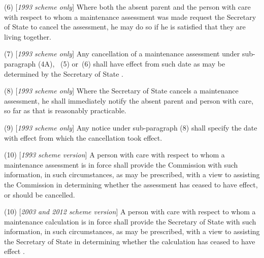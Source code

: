 \documentclass[12pt,a4paper]{article}
\begin{document}
(6) [\emph{1993 scheme only}] Where both the absent parent and the person with care with respect to whom a maintenance assessment was made request 
the Secretary of State  %
to cancel the assessment, he may do so if he is satisfied that they are living together.

(7) [\emph{1993 scheme only}] Any cancellation of a maintenance assessment under sub-paragraph 
(4A),~%
(5)  or~(6)  shall have effect from such date as may be determined by 
the Secretary of State%
.

(8) [\emph{1993 scheme only}] Where 
the Secretary of State  %
cancels a maintenance assessment, he shall immediately notify the absent parent and person with care, so far as that is reasonably practicable.

(9) [\emph{1993 scheme only}] Any notice under sub-paragraph (8)  shall specify the date with effect from which the cancellation took effect.

(10) [\emph{1993 scheme version}] A person with care with respect to whom a maintenance assessment is in force shall provide the 
Commission  %
with such information, in such circumstances, as may be prescribed, with a view to assisting the 
Commission  %
in determining whether the assessment has ceased to have effect, or should be cancelled.

(10) [\emph{2003 and 2012 scheme version}] A person with care with respect to whom a 
maintenance calculation  %
is in force shall provide the 
Secretary of State  %
with such information, in such circumstances, as may be prescribed, with a view to assisting the 
Secretary of State  %
in determining whether the 
calculation  %
has ceased to have effect%
.
\end{document}
